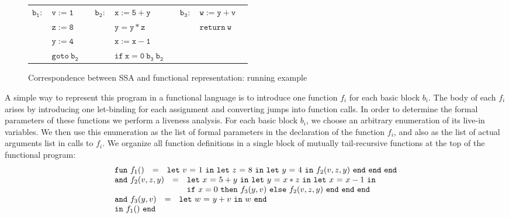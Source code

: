 \begin{figure}
\begin{tabular}{rlcrlcrll}
$\mathtt{b_1:}$ & $\mathtt{v:=1}$ & \quad &
  $\mathtt{b_2:}$ & $\mathtt{x:=5+y}$ & \quad &
  $\mathtt{b_3:}$ & $\mathtt{w:=y+v}$\\
& $\mathtt{z:=8}$ & & & $\mathtt{y=y*z}$ & & & $\mathtt{return\ w}$\\
& $\mathtt{y:=4}$ & & & $\mathtt{x:=x-1}$\\
& $\mathtt{goto}\ \mathtt{b_2}$ & & & $\mathtt{if\ x=0\ b_3\ b_2}$
\end{tabular}
\caption{\label{fig:FunctionalCorrespondenceRunningExample} Correspondence between SSA and functional representation: running example}
\end{figure}

A simple way to represent this program in a functional language is to
introduce one function $f_i$ for each basic block $b_i$. The body of
each $f_i$ arises by introducing one let-binding for each assignment
and converting jumps into function calls. In order to determine the
formal parameters of these functions we perform a liveness
analysis. For each basic block $b_i$, we choose an arbitrary
enumeration of its live-in variables. We then use this enumeration as
the list of formal parameters in the declaration of the function
$f_i$, and also as the list of actual arguments list in calls to
$f_i$. We organize all function definitions in a single block of
mutually tail-recursive functions at the top of the functional
program: 
$$\begin{array}{l}
\begin{array}{lcl}
  \mathtt{fun}\ f_1() & = &
   \letin v 1 {
              \letin z 8 {
                 \letin y 4 {\call {f_2} {v,z,y}}
              }
            }
\end{array}\\
\begin{array}{lcl}
\mathtt{and}\ f_2(v,z,y) & = & 
  \letinD x {5+y} {
              \letinD y {x*z} {
                 \letinD x {x-1} {}}}\\ & & 
   \ite {x=0} {\call {f_3} {y,v}} 
              {\call {f_2} {v,z,y}}\ \mathtt{end}\ \mathtt{end}\ \mathtt{end}
\end{array}\\
\begin{array}{lcl}
  \mathtt{and}\ f_3(y,v) & = & \letin w {y+v} w\\
  \mathtt{in}\ f_1()\ \mathtt{end}
\end{array} 
\end{array}
$$ 
